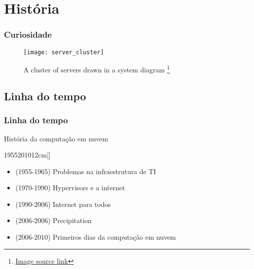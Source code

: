\section{História}

\begin{frame}
	\frametitle{Curiosidade}
	\begin{figure}[htpb]
		\centering
		\texttt{[image: server\_cluster]}
		\caption{A cluster of servers drawn in a system diagram \footnote{\href{https://www.youtube.com/watch?v=e3UMvBP2RRo}{Image source link}}}
	\end{figure}
\end{frame}

\subsection{Linha do tempo}

\begin{frame}
	\frametitle{Linha do tempo}
	\begin{center}
		História da computação em nuvem\cite{CCHistory}
	\end{center}
	\hfill
	\begin{scriptsize}
	\begin{bf}
	\begin{center}
		\begin{chronology}[10]{1955}{2010}{12cm}[\textwidth]
		\end{chronology}
	\end{center}
	\end{bf}
	\hfill
	\begin{itemize}
		\item (1955-1965) Problemas na infraestrutura de TI
		\item (1970-1990) Hypervisors e a internet
		\item (1990-2006) Internet para todos
		\item (2006-2006) Precipitation
		\item (2006-2010) Primeiros dias da computação em nuvem
	\end{itemize}
	\end{scriptsize}
\end{frame}

